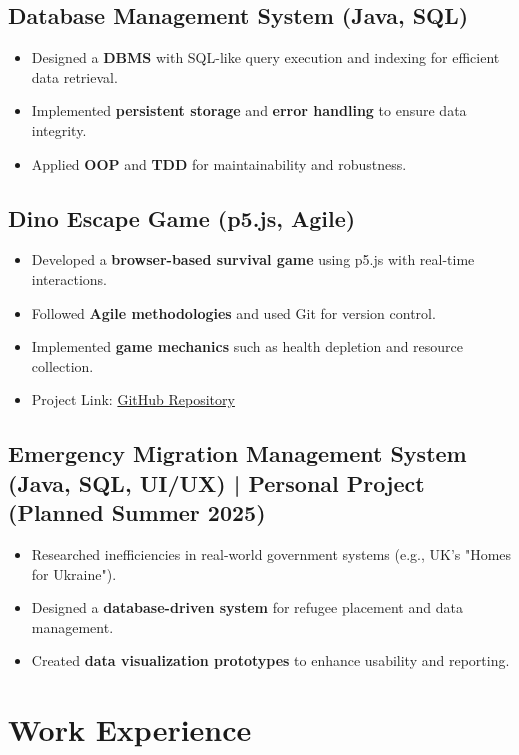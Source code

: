 \documentclass[10pt,a4paper]{article} %
\begin{document}
\subsection*{Database Management System (Java, SQL)}
\begin{itemize}
    \item Designed a \textbf{DBMS} with SQL-like query execution and indexing for efficient data retrieval.
    \item Implemented \textbf{persistent storage} and \textbf{error handling} to ensure data integrity.
    \item Applied \textbf{OOP} and \textbf{TDD} for maintainability and robustness.
\end{itemize}

\subsection*{Dino Escape Game (p5.js, Agile)}
\begin{itemize}
    \item Developed a \textbf{browser-based survival game} using p5.js with real-time interactions.
    \item Followed \textbf{Agile methodologies} and used Git for version control.
    \item Implemented \textbf{game mechanics} such as health depletion and resource collection.
    \item Project Link: \href{https://github.com/UoB-COMSM0166/2025-group-13}{GitHub Repository}
\end{itemize}

\subsection*{Emergency Migration Management System (Java, SQL, UI/UX) | Personal Project (Planned Summer 2025)}
\begin{itemize}
    \item Researched inefficiencies in real-world government systems (e.g., UK's "Homes for Ukraine").
    \item Designed a \textbf{database-driven system} for refugee placement and data management.
    \item Created \textbf{data visualization prototypes} to enhance usability and reporting.
\end{itemize}

\section*{Work Experience}
\end{document}
